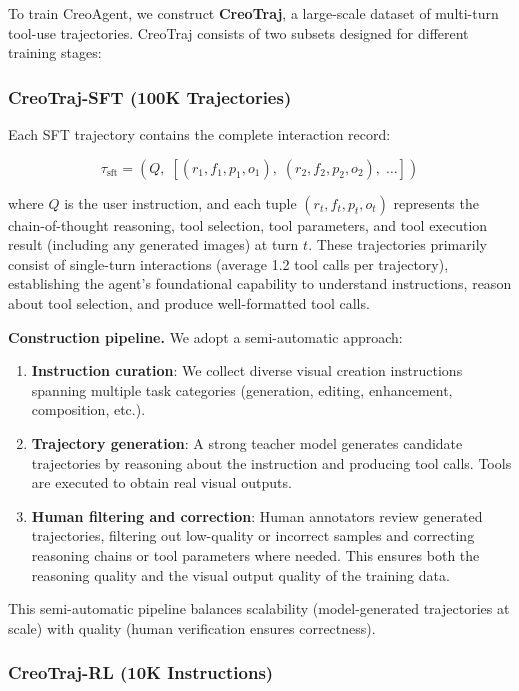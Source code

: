 \documentclass[11pt]{article}
\begin{document}
To train CreoAgent, we construct \textbf{CreoTraj}, a large-scale dataset of multi-turn tool-use trajectories. CreoTraj consists of two subsets designed for different training stages:

\subsubsection{CreoTraj-SFT (100K Trajectories)}

Each SFT trajectory contains the complete interaction record:

$$\tau_{\text{sft}} = (Q, \; [(r_1, f_1, p_1, o_1), \; (r_2, f_2, p_2, o_2), \; \ldots])$$

where $Q$ is the user instruction, and each tuple $(r_t, f_t, p_t, o_t)$ represents the chain-of-thought reasoning, tool selection, tool parameters, and tool execution result (including any generated images) at turn $t$. These trajectories primarily consist of single-turn interactions (average 1.2 tool calls per trajectory), establishing the agent's foundational capability to understand instructions, reason about tool selection, and produce well-formatted tool calls.

\textbf{Construction pipeline.} We adopt a semi-automatic approach:

\begin{enumerate}
    \item \textbf{Instruction curation}: We collect diverse visual creation instructions spanning multiple task categories (generation, editing, enhancement, composition, etc.).
    \item \textbf{Trajectory generation}: A strong teacher model generates candidate trajectories by reasoning about the instruction and producing tool calls. Tools are executed to obtain real visual outputs.
    \item \textbf{Human filtering and correction}: Human annotators review generated trajectories, filtering out low-quality or incorrect samples and correcting reasoning chains or tool parameters where needed. This ensures both the reasoning quality and the visual output quality of the training data.
\end{enumerate}

This semi-automatic pipeline balances scalability (model-generated trajectories at scale) with quality (human verification ensures correctness).

\subsubsection{CreoTraj-RL (10K Instructions)}
\end{document}
